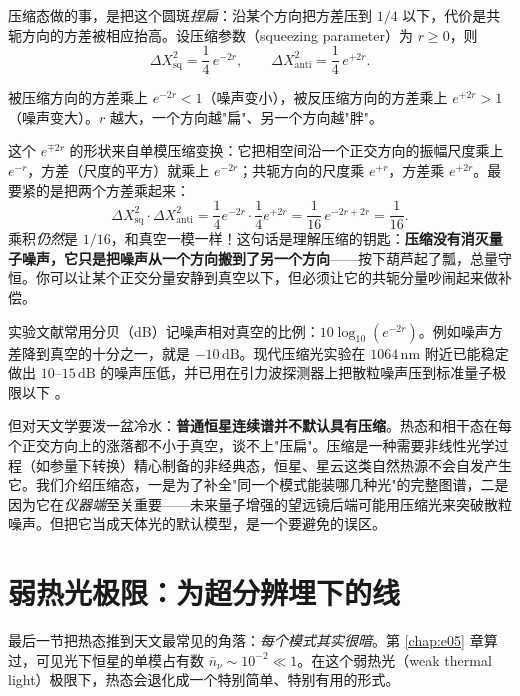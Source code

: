 压缩态做的事，是把这个圆斑\emph{捏扁}：沿某个方向把方差压到 \(1/4\) 以下，代价是共轭方向的方差被相应抬高。设压缩参数（squeezing parameter）为 \(r\ge0\)，则
\begin{equation}
  \Delta X_{\text{sq}}^{2}=\frac{1}{4}\,e^{-2r},
  \qquad
  \Delta X_{\text{anti}}^{2}=\frac{1}{4}\,e^{+2r}.
  \label{eq:e06-squeeze-var}
\end{equation}
\begin{formulaexplain}
被压缩方向的方差乘上 \(e^{-2r}<1\)（噪声变小），被反压缩方向的方差乘上 \(e^{+2r}>1\)（噪声变大）。\(r\) 越大，一个方向越"扁"、另一个方向越"胖"。
\end{formulaexplain}

这个 \(e^{\mp 2r}\) 的形状来自单模压缩变换：它把相空间沿一个正交方向的振幅尺度乘上 \(e^{-r}\)，方差（尺度的平方）就乘上 \(e^{-2r}\)；共轭方向的尺度乘 \(e^{+r}\)，方差乘 \(e^{+2r}\)。最要紧的是把两个方差乘起来：
\[
  \Delta X_{\text{sq}}^{2}\cdot\Delta X_{\text{anti}}^{2}
  =\frac14 e^{-2r}\cdot\frac14 e^{+2r}
  =\frac{1}{16}\,e^{-2r+2r}
  =\frac{1}{16}.
\]
乘积\emph{仍然}是 \(1/16\)，和真空一模一样！这句话是理解压缩的钥匙：\textbf{压缩没有消灭量子噪声，它只是把噪声从一个方向搬到了另一个方向}——按下葫芦起了瓢，总量守恒。你可以让某个正交分量安静到真空以下，但必须让它的共轭分量吵闹起来做补偿。

实验文献常用分贝（dB）记噪声相对真空的比例：\(10\log_{10}(e^{-2r})\)。例如噪声方差降到真空的十分之一，就是 \(-10\,\text{dB}\)。现代压缩光实验在 \(1064\,\text{nm}\) 附近已能稳定做出 \(10\)–\(15\,\text{dB}\) 的噪声压低，并已用在引力波探测器上把散粒噪声压到标准量子极限以下 \citep{1983Natur.306..141W,2016PhRvL.117k0801V}。

但对天文学要泼一盆冷水：\textbf{普通恒星连续谱并不默认具有压缩}。热态和相干态在每个正交方向上的涨落都不小于真空，谈不上"压扁"。压缩是一种需要非线性光学过程（如参量下转换）精心制备的非经典态，恒星、星云这类自然热源不会自发产生它。我们介绍压缩态，一是为了补全"同一个模式能装哪几种光"的完整图谱，二是因为它在\emph{仪器端}至关重要——未来量子增强的望远镜后端可能用压缩光来突破散粒噪声。但把它当成天体光的默认模型，是一个要避免的误区。

\section{弱热光极限：为超分辨埋下的线}
\label{sec:e06-weak}

最后一节把热态推到天文最常见的角落：\emph{每个模式其实很暗}。第 \ref{chap:e05} 章算过，可见光下恒星的单模占有数 \(\bar n_\nu\sim10^{-2}\ll1\)。在这个弱热光（weak thermal light）极限下，热态会退化成一个特别简单、特别有用的形式。


